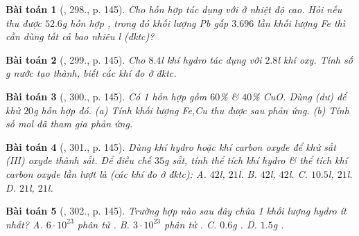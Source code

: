 \documentclass{article}
\newtheorem{baitoan}{Bài toán}
\begin{document}
\begin{baitoan}[\cite{An_400_BT_Hoa_Hoc_8_2020}, 298., p. 145]
	Cho hỗn hợp \emph{} tác dụng với \emph{} ở nhiệt độ cao. Hỏi nếu thu được $52.6$\emph{g} hỗn hợp \emph{}, trong đó khối lượng \emph{Pb} gấp $3.696$ lần khối lượng \emph{Fe} thì cần dùng tất cả bao nhiêu \emph{l} \emph{} (đktc)?
\end{baitoan}

\begin{baitoan}[\cite{An_400_BT_Hoa_Hoc_8_2020}, 299., p. 145]
	Cho $8.4$\emph{l} khí hydro tác dụng với $2.8$\emph{l} khí oxy. Tính số \emph{g} nước tạo thành, biết các khí đo ở đktc.
\end{baitoan}

\begin{baitoan}[\cite{An_400_BT_Hoa_Hoc_8_2020}, 300., p. 145]
	Có 1 hỗn hợp gồm $60$\% \emph{} \& $40$\% \emph{CuO}. Dùng \emph{} (dư) để khử $20$\emph{g} hỗn hợp đó. (a) Tính khối lượng \emph{Fe,Cu} thu được sau phản ứng. (b) Tính số mol \emph{} đã tham gia phản ứng.
\end{baitoan}

\begin{baitoan}[\cite{An_400_BT_Hoa_Hoc_8_2020}, 301., p. 145]
	Dùng khí hydro hoặc khí carbon oxyde để khử sắt (III) oxyde thành sắt. Để điều chế $35$\emph{g} sắt, tính thể tích khí hydro \& thể tích khí carbon oxyde lần lượt là (các khí đo ở đktc): {\sf A.} $42$\emph{l}, $21$\emph{l}. {\sf B.} $42$\emph{l}, $42$\emph{l}. {\sf C.} $10.5$\emph{l}, $21$\emph{l}. {\sf D.} $21$\emph{l}, $21$\emph{l}.
\end{baitoan}

\begin{baitoan}[\cite{An_400_BT_Hoa_Hoc_8_2020}, 302., p. 145]
	Trường hợp nào sau đây chứa 1 khối lượng hydro ít nhất? {\sf A.} $6\cdot10^{23}$ phân tử \emph{}. {\sf B.} $3\cdot10^{23}$ phân tử \emph{}. {\sf C.} $0.6$\emph{g} \emph{}. {\sf D.} $1.5$\emph{g} \emph{}.
\end{baitoan}

\end{document}
